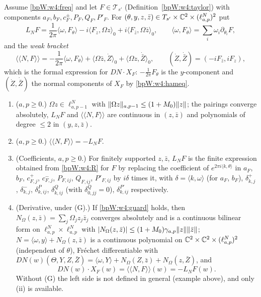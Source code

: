 \begin{lemma}\label{bpW:w4:lie}
Assume \eqref{bpW:w4:freq} and let $F\in\mathcal T_{s'}$ (Definition~\ref{bpW:w4:taylor}) with components
$a_F,b_F,c^\pm_F,P_F,Q_F,P'_F$. For $(\theta,y,z,\bar z)\in T_{s'}\times\mathbb{C}^2\times(\ell^N_{a,p})^2$ put
\[L_NF=\frac1{2\pi}\langle\omega,F_\theta\rangle-i\langle F_z,\Omega z\rangle_0+i\langle F_{\bar z},\Omega\bar z\rangle_0,\qquad
\langle\omega,F_\theta\rangle=\sum_i\omega_i\partial_{\theta_i}F,\]
and the \emph{weak bracket}
\[\langle\!\langle N,F\rangle\!\rangle=-\frac1{2\pi}\langle\omega,F_\theta\rangle+\langle\Omega\bar z,\dot Z\rangle_0+\langle\Omega z,\dot{\bar Z}\rangle_0,
\qquad(\dot Z,\dot{\bar Z})=(-iF_{\bar z},iF_z),\]
which is the formal expression for $DN\cdot X_F$: $-\frac1{2\pi}F_\theta$ is the $y$-component and $(\dot Z,\dot{\bar Z})$ the
normal components of $X_F$ by \eqref{bpW:w4:hameq}.
\begin{enumerate}[label=(\roman*)]
\item ($a,p\ge0$.) $\Omega z\in\ell^N_{a,p-1}$ with $\lVert \Omega z\rVert_{a,p-1}\le(1+M_0)\lVert z\rVert$; the pairings converge
  absolutely, $L_NF$ and $\langle\!\langle N,F\rangle\!\rangle$ are continuous in $(z,\bar z)$ and polynomials of degree $\le2$ in
  $(y,z,\bar z)$.
\item ($a,p\ge0$.) $\langle\!\langle N,F\rangle\!\rangle=-L_NF$.
\item (Coefficients, $a,p\ge0$.) For finitely supported $z,\bar z$, $L_NF$ is the finite expression obtained from
  \eqref{bpW:w4:R} for $F$ by replacing the coefficient of $e^{2\pi i\langle k,\theta\rangle}$ in
  $a_F$, $b_F$, $c^+_{F,j}$, $c^-_{F,j}$, $P_{F,ij}$, $Q_{F,ij}$, $P'_{F,ij}$ by $i\delta$ times it, with
  $\delta=\langle k,\omega\rangle$ (for $a_F$, $b_F$), $\delta^+_{k,j}$, $\delta^-_{k,j}$, $\delta^P_{k,ij}$, $\delta^Q_{k,ij}$
  (with $\delta^Q_{0,jj}=0$), $\delta^{P'}_{k,ij}$ respectively.
\item (Derivative, under (G).) If \eqref{bpW:w4:guard} holds, then $N_\Omega(z,\bar z)=\sum_j\Omega_jz_j\bar z_j$
  converges absolutely and is a continuous bilinear form on $\ell^N_{a,p}\times\ell^N_{a,p}$ with
  $\lvert N_\Omega(z,\bar z)\rvert\le(1+M_0)\gamma_{a,p}\lVert z\rVert\lVert \bar z\rVert$; $N=\langle\omega,y\rangle+N_\Omega(z,\bar z)$ is a
  continuous polynomial on $\mathbb{C}^2\times\mathbb{C}^2\times(\ell^N_{a,p})^2$ (independent of $\theta$), Fr\'echet differentiable with
  $DN(w)(\Theta,Y,Z,\bar Z)=\langle\omega,Y\rangle+N_\Omega(Z,\bar z)+N_\Omega(z,\bar Z)$, and
  \[DN(w)\cdot X_F(w)=\langle\!\langle N,F\rangle\!\rangle(w)=-L_NF(w).\]
  Without (G) the left side is not defined in general (example above), and only (ii) is available.
\end{enumerate}
\end{lemma}

